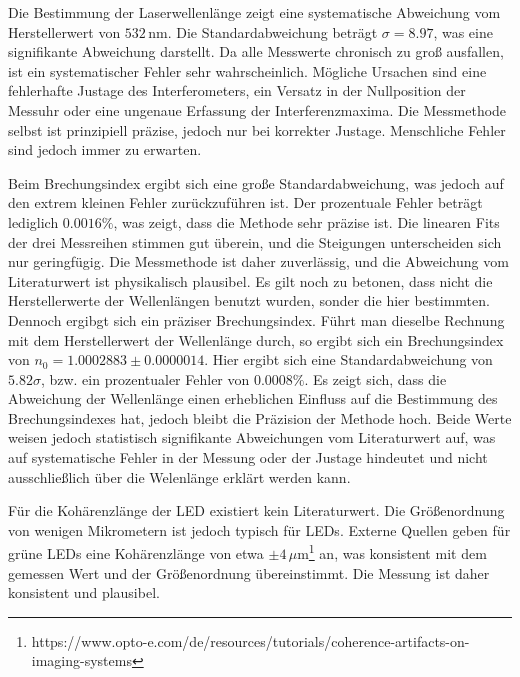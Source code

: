 Die Bestimmung der Laserwellenlänge zeigt eine systematische Abweichung vom Herstellerwert von \(532\,\mathrm{nm}\). Die Standardabweichung beträgt \(\sigma = 8.97\), was eine signifikante Abweichung darstellt. Da alle Messwerte chronisch zu groß ausfallen, ist ein systematischer Fehler sehr wahrscheinlich. Mögliche Ursachen sind eine fehlerhafte Justage des Interferometers, ein Versatz in der Nullposition der Messuhr oder eine ungenaue Erfassung der Interferenzmaxima. Die Messmethode selbst ist prinzipiell präzise, jedoch nur bei korrekter Justage. Menschliche Fehler sind jedoch immer zu erwarten.

Beim Brechungsindex ergibt sich eine große Standardabweichung, was jedoch auf den extrem kleinen Fehler zurückzuführen ist. Der prozentuale Fehler beträgt lediglich $0.0016\%$, was zeigt, dass die Methode sehr präzise ist. Die linearen Fits der drei Messreihen stimmen gut überein, und die Steigungen unterscheiden sich nur geringfügig. Die Messmethode ist daher zuverlässig, und die Abweichung vom Literaturwert ist physikalisch plausibel.
Es gilt noch zu betonen, dass nicht die Herstellerwerte der Wellenlängen benutzt wurden, sonder die hier bestimmten. Dennoch ergibgt sich ein präziser Brechungsindex. Führt man dieselbe Rechnung mit dem Herstellerwert der Wellenlänge durch, so ergibt sich ein Brechungsindex von $n_0 = 1.0002883 \pm 0.0000014$. Hier ergibt sich eine Standardabweichung von $5.82\sigma$, bzw. ein prozentualer Fehler von $0.0008\%$. Es zeigt sich, dass die Abweichung der Wellenlänge einen erheblichen Einfluss auf die Bestimmung des Brechungsindexes hat, jedoch bleibt die Präzision der Methode hoch. Beide Werte weisen jedoch statistisch signifikante Abweichungen vom Literaturwert auf, was auf systematische Fehler in der Messung oder der Justage hindeutet und nicht ausschließlich über die Welenlänge erklärt werden kann.

Für die Kohärenzlänge der LED existiert kein Literaturwert. Die Größenordnung von wenigen Mikrometern ist jedoch typisch für LEDs. Externe Quellen geben für grüne LEDs eine Kohärenzlänge von etwa \(\pm 4\,\mu\mathrm{m}\)\footnote{https://www.opto-e.com/de/resources/tutorials/coherence-artifacts-on-imaging-systems} an, was konsistent mit dem gemessen Wert und der Größenordnung übereinstimmt. Die Messung ist daher konsistent und plausibel.


